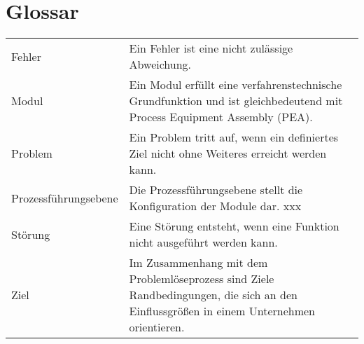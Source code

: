 
\printnomenclature  [3 cm]





\section*{Glossar}
\vspace{-0.3 cm}
\hspace{-0.3 cm}
\begin{tabular}{p{4cm}p{9cm}}
Fehler & Ein Fehler ist eine nicht zulässige Abweichung. \\
Modul & Ein Modul erfüllt eine verfahrenstechnische Grundfunktion und ist gleichbedeutend mit Process Equipment Assembly (PEA). \\
Problem & Ein Problem tritt auf, wenn ein definiertes Ziel nicht ohne Weiteres erreicht werden kann. \\
Prozessführungsebene & Die Prozessführungsebene stellt die Konfiguration der Module dar. xxx \\
Störung & Eine Störung entsteht, wenn eine Funktion nicht ausgeführt werden kann. \\
Ziel & Im Zusammenhang mit dem Problemlöseprozess sind Ziele Randbedingungen, die sich an den Einflussgrößen in einem Unternehmen orientieren. \\
\end{tabular}
